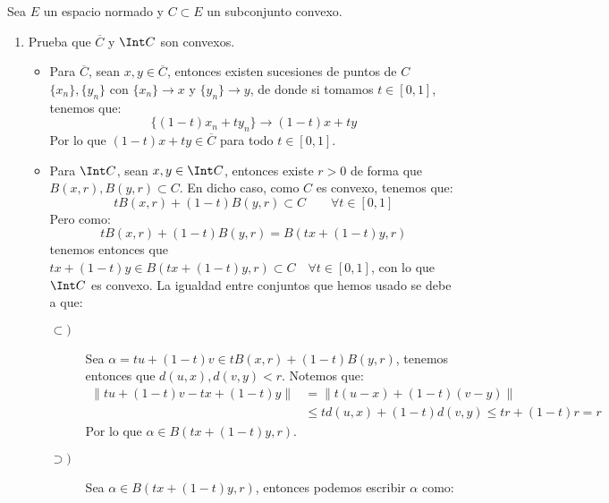 \begin{ejercicio}
    Sea $E$ un espacio normado y $C\subset E$ un subconjunto convexo.
    \begin{enumerate}[label=\alph*)]
        \item Prueba que $\overline{C}$ y $\Int C$ son convexos.

            \begin{itemize}
                \item Para $\overline{C}$, sean $x,y\in \overline{C}$, entonces existen sucesiones de puntos de $C$ $\{x_n\},\{y_n\}$ con $\{x_n\}\to x$ y $\{y_n\}\to y$, de donde si tomamos $t\in [0,1]$, tenemos que:
                    \begin{equation*}
                        \{(1-t)x_n + ty_n\} \to (1-t)x+ty
                    \end{equation*}
                    Por lo que $(1-t)x+ty\in \overline{C}$ para todo $t\in [0,1]$.
                \item Para $\Int C$, sean $x,y\in \Int C$, entonces existe $r>0$ de forma que $B(x,r),B(y,r)\subset C$. En dicho caso, como $C$ es convexo, tenemos que:
                    \begin{equation*}
                        tB(x,r) + (1-t)B(y,r) \subset C \qquad \forall t\in [0,1]
                    \end{equation*}
                    Pero como:
                    \begin{equation*}
                        tB(x,r) + (1-t)B(y,r) = B(tx+(1-t)y,r)
                    \end{equation*}
                    tenemos entonces que $tx + (1-t)y \in B(tx+(1-t)y,r)\subset C\quad \forall t\in [0,1]$, con lo que $\Int C$ es convexo. La igualdad entre conjuntos que hemos usado se debe a que:
                    \begin{description}
                        \item [$\subset)$] Sea $\alpha=tu+(1-t)v\in tB(x,r)+(1-t)B(y,r)$, tenemos entonces que $d(u,x),d(v,y)<r$. Notemos que:
                            \begin{align*}
                                \|tu+(1-t)v - tx+(1-t)y\| &= \|t(u-x)+(1-t)(v-y)\| \\ 
                                &\leq td(u,x) + (1-t)d(v,y) \leq tr + (1-t)r = r
                            \end{align*}
                            Por lo que $\alpha\in B(tx+(1-t)y,r)$.
                        \item [$\supset)$] Sea $\alpha\in B(tx+(1-t)y,r)$, entonces podemos escribir $\alpha$ como:

\end{description}
\end{itemize}
\end{enumerate}
\end{ejercicio}
